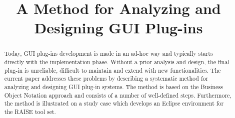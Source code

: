 \documentclass[conference]{IEEEtran}
\begin{document}
%
\title{A Method for Analyzing and Designing GUI Plug-ins}


\author{
\and

\and

}





\maketitle


\begin{abstract}
Today, GUI plug-ins development is made in an ad-hoc way and typically starts directly with the implementation phase.
Without a prior analysis and design, the final plug-in is unreliable, difficult to maintain and extend with new functionalities. 
The current paper addresses these problems by describing a systematic method for analyzing and designing GUI plug-in systems. 
The method is based on the Business Object Notation approach and consists of a number of well-defined steps. 
Furthermore, the method is illustrated on a study case which develops an Eclipse environment for the RAISE tool set.
\end{abstract}


%
\IEEEpeerreviewmaketitle
\end{document}
